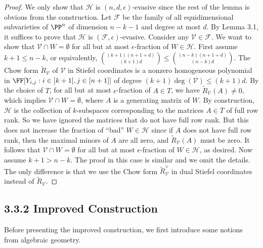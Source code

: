 \begin{proof}
We only show that $\mathcal H$ is $(n,d,\epsilon)$-evasive since the rest of the lemma is obvious from the construction. Let $\mathcal F$ be the family of all equidimensional subvarieties of $\PP^n$ of dimension $n-k-1$ and degree at most $d$. By Lemma 3.1, it suffices to prove that $\mathcal H$ is $(\mathcal F,\epsilon)$-evasive. Consider any $\mathcal V\in\mathcal F$. We want to show that $\mathcal V\cap W=\emptyset$ for all but at most $\epsilon$-fraction of $W\in\mathcal H$.
First assume $k+1\le n-k$, or equivalently, $\binom{(k+1)(n+1+d)}{(k+1)d}\le\binom{(n-k)(n+1+d)}{(n-k)d}$. The Chow form $\widetilde R_{\mathcal V}$ of $\mathcal V$ in Stiefel coordinates is a nonzero homogeneous polynomial in $\FF[Y_{i,j}:i\in[k+1],j\in[n+1]]$ of degree $(k+1)\deg(\mathcal V)\le(k+1)d$. By the choice of $T$, for all but at most $\epsilon$-fraction of $A\in T$, we have $\widetilde R_{\mathcal V}(A)\ne0$, which implies $\mathcal V\cap W=\emptyset$, where $A$ is a generating matrix of $W$.
By construction, $\mathcal H$ is the collection of $k$-subspaces corresponding to the matrices $A\in T$ of full row rank. So we have ignored the matrices that do not have full row rank. But this does not increase the fraction of ``bad'' $W\in\mathcal H$ since if $A$ does not have full row rank, then the maximal minors of $A$ are all zero, and $\widetilde R_{\mathcal V}(A)$ must be zero. It follows that $\mathcal V\cap W=\emptyset$ for all but at most $\epsilon$-fraction of $W\in\mathcal H$, as desired.
Now assume $k+1>n-k$. The proof in this case is similar and we omit the details. The only difference is that we use the Chow form $\widetilde R^\vee_{\mathcal V}$ in dual Stiefel coordinates instead of $\widetilde R_{\mathcal V}$.
\end{proof}
\subsection*{3.3.2 Improved Construction}
Before presenting the improved construction, we first introduce some notions from algebraic geometry.
